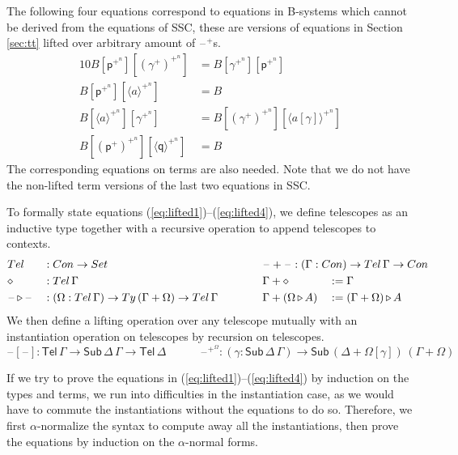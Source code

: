 \documentclass[a4paper,UKenglish,cleveref, autoref, thm-restate]{lipics-v2021}
\newcommand{\ra}{\rightarrow}
\newcommand{\Set}{\mathsf{Set}}
\newcommand{\Ty}{\mathsf{Ty}}
\newcommand{\Con}{\mathsf{Con}}
\newcommand{\Sub}{\mathsf{Sub}}
\newcommand{\Tel}{\mathsf{Tel}}
\newcommand{\p}{\mathsf{p}}
\newcommand{\q}{\mathsf{q}}
\newcommand{\ext}{\mathop{\triangleright}}
\newcommand{\blank}{\mathord{\hspace{1pt}\text{--}\hspace{1pt}}} %
\begin{document}
The following four equations correspond to equations in B-systems which cannot
be derived from the equations of SSC, these are versions of equations in Section
\ref{sec:tt} lifted over arbitrary amount of $\blank^+$s.
\begin{alignat}{10}
  B[\p^{+^n}][(\gamma^+)^{+^n}] & = B[\gamma^{+^n}][\p^{+^n}] \label{eq:lifted1} \\
  B[\p^{+^n}][\langle a \rangle^{+^n}] & = B \label{eq:lifted2} \\
  B[\langle a \rangle^{+^n}][\gamma^{+^n}] & = B[(\gamma^+)^{+^n}][\langle a[\gamma] \rangle^{+^n}] \label{eq:lifted3} \\
  B[(\p^+)^{+^n}][\langle\q\rangle^{+^n}] & = B\label{eq:lifted4}
\end{alignat}
The corresponding equations on terms are also needed. Note that we do not have
the non-lifted term versions of the last two equations in SSC.

To formally state equations (\ref{eq:lifted1})--(\ref{eq:lifted4}), we
define telescopes as an inductive type together with a recursive
operation to append telescopes to contexts.
\begin{alignat*}{10}
  & \Tel && : \Con\ra\Set   && \rlap{$\blank+\blank : (\Gamma:\Con)\ra\Tel\,\Gamma\ra\Con$} \\
  & \diamond && : \Tel\,\Gamma && \Gamma+\diamond && := \Gamma \\
  & \blank\ext\blank && : (\Omega:\Tel\,\Gamma)\ra\Ty\,(\Gamma+\Omega)\ra\Tel\,\Gamma \hspace{3em} && \Gamma+(\Omega\ext A) && := (\Gamma+\Omega)\ext A
\end{alignat*}
We then define a lifting operation over any telescope mutually with an
instantiation operation on telescopes by recursion on telescopes.
\[
\blank[\blank] : \Tel\,\Gamma\ra\Sub\,\Delta\,\Gamma\ra\Tel\,\Delta \hspace{3em}
\blank^{+^\Omega} : (\gamma:\Sub\,\Delta\,\Gamma)\ra\Sub\,(\Delta+\Omega[\gamma])\,(\Gamma+\Omega)
\]

If we try to prove the equations in (\ref{eq:lifted1})--(\ref{eq:lifted4}) by induction on the types
and terms, we run into difficulties in the instantiation case, as we would have
to commute the instantiations without the equations to do so. Therefore, we
first $\alpha$-normalize the syntax to compute away all the instantiations, then
prove the equations by induction on the $\alpha$-normal forms.
\end{document}
